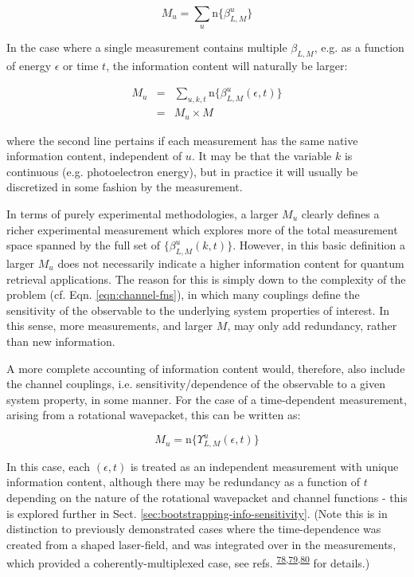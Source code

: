 \documentclass[10pt]{article}
\begin{document}
\begin{equation}
M_{u}=\sum_{u}\mathrm{n}\{\beta_{L,M}^{u}\}
\end{equation}

In the case where a single measurement contains multiple $\beta_{L,M}$, e.g. as a function of energy $\epsilon$ or time $t$, the information content will naturally be larger:

\begin{eqnarray}
M_{u} & = & \sum_{u,k,t}\mathrm{n}\{\beta_{L,M}^{u}(\epsilon,t)\}\\
 & = & M_{u}\times M
\end{eqnarray}

where the second line pertains if each measurement has the same native
information content, independent of $u$. It may be that the variable
$k$ is continuous (e.g. photoelectron energy), but in practice it
will usually be discretized in some fashion by the measurement.

In terms of purely experimental methodologies, a larger $M_{u}$ clearly defines a richer experimental measurement which explores more of the total measurement space spanned by the full set of $\{\beta_{L,M}^{u}(k,t)\}$. However, in this basic definition a larger $M_{u}$ does not necessarily indicate a higher information content for quantum retrieval applications.
The reason for this is simply down to the complexity of the problem
(cf. Eqn. \ref{eqn:channel-fns}), in which many couplings define
the sensitivity of the observable to the underlying system properties
of interest. In this sense, more measurements, and larger $M$, may
only add redundancy, rather than new information.

A more complete accounting of information content would, therefore,
also include the channel couplings, i.e. sensitivity/dependence of the observable to a given system property, in some manner. For the case of a time-dependent measurement, arising from a rotational wavepacket, this can be written as:

\begin{equation}
M_{u}=\mathrm{n}\{\varUpsilon_{L,M}^{u}(\epsilon,t)\}
\end{equation}

In this case, each $(\epsilon,t)$ is treated as an independent measurement with unique information content, although there may be redundancy as a function of $t$ depending on the nature of the rotational wavepacket and channel functions - this is explored further in Sect. \ref{sec:bootstrapping-info-sensitivity}. (Note this is in distinction to previously demonstrated cases where the time-dependence was created from a shaped laser-field, and was integrated over in the measurements, which provided a coherently-multiplexed case, see refs. \textsuperscript{\hyperref[csl:78]{78},\hyperref[csl:79]{79},\hyperref[csl:80]{80}} for details.)
\end{document}
